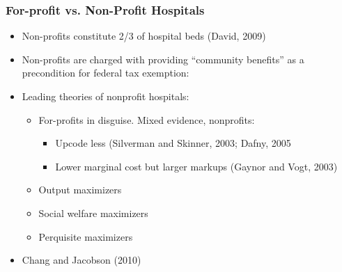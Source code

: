 \documentclass[ucs,9pt]{beamer}
\begin{document}
\begin{frame}
\frametitle{For-profit vs. Non-Profit Hospitals}
\begin{itemize}
\item Non-profits constitute 2/3 of hospital beds (David, 2009)
\item Non-profits are charged with providing ``community benefits'' as a precondition for federal tax exemption:
\item Leading theories of nonprofit hospitals:
\begin{itemize}
\item For-profits in disguise.  Mixed evidence, nonprofits:
\begin{itemize}
\item Upcode less (Silverman and Skinner, 2003; Dafny, 2005
\item  Lower marginal cost but larger markups (Gaynor and Vogt, 2003)
\end{itemize}
\item Output maximizers
\item Social welfare maximizers
\item Perquisite maximizers
\end{itemize}
\item Chang and Jacobson (2010)
\end{itemize}
\end{frame}
\end{document}
